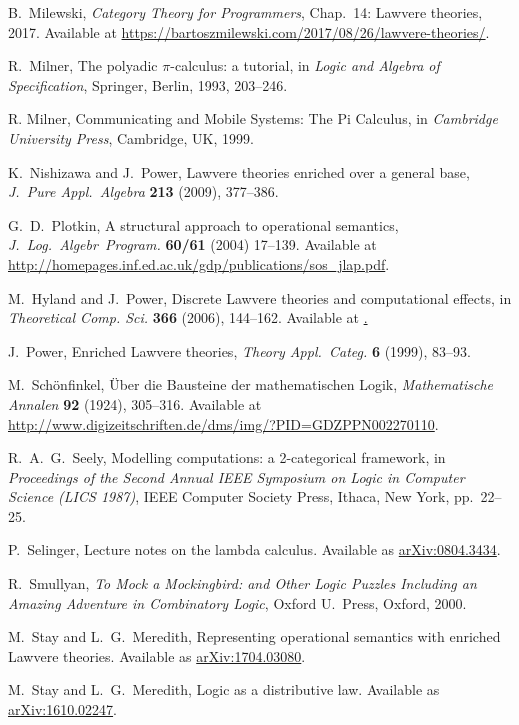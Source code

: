 \documentclass{amsart}
\theoremstyle{definition}
\begin{document}
\begin{thebibliography}{100}

 B.\ Milewski, \textsl{Category Theory for Programmers}, Chap.\ 14: Lawvere theories, 2017.   Available at \href{https://bartoszmilewskiski.com/2017/08/26/lawvere-theories/}{https://bartoszmilewski.com/2017/08/26/lawvere-theories/}.

 R.\ Milner, The polyadic {$\pi$}-calculus: a tutorial, in \textsl{Logic and Algebra of Specification}, Springer, Berlin, 1993, 203--246.

 R. Milner, Communicating and Mobile Systems: The Pi Calculus, in \textsl{Cambridge University Press}, Cambridge, UK, 1999.

 K.\ Nishizawa and J.\ Power, Lawvere theories enriched over a general base, \textsl{J.\ Pure Appl.\ Algebra}  \textbf{213} (2009), 377--386.

 G.\ D.\ Plotkin, A structural approach to operational semantics, \textsl{J.\ Log.\ Algebr\ Program.} \textbf{60/61} (2004) 17--139.  Available at \href{http://homepages.inf.ed.ac.uk/gdp/publications/sos_jlap.pdf}{http://homepages.inf.ed.ac.uk/gdp/publications/sos\_jlap.pdf}.

 M.\ Hyland and J.\ Power, Discrete Lawvere theories and computational effects, in \textsl{Theoretical Comp.
Sci.} \textbf{366} (2006), 144--162. Available at \href{https://core.ac.uk/download/pdf/81105779.pdf}.
  
 J.\ Power, Enriched Lawvere theories, \textsl{Theory Appl.\ Categ.}  \textbf{6} (1999), 83--93.

 M.\ Sch\"{o}nfinkel, \"Uber die Bausteine der mathematischen Logik, 
 \textsl{Mathematische Annalen} \textbf{92} (1924), 305--316.  Available at \href{http://www.digizeitschriften.de/dms/img/?PID=GDZPPN002270110}{http://www.digizeitschriften.de/dms/img/?PID=GDZPPN002270110}.

 R.\ A.\ G.\ Seely, Modelling computations: a 2-categorical framework, in
\textsl{Proceedings of the Second Annual IEEE Symposium on Logic in Computer Science (LICS 1987)}, IEEE Computer Society Press, Ithaca, New York, pp.\ 22--25.
 
  P.\ Selinger, Lecture notes on the lambda calculus.  Available as 
 \href{https://arxiv.org/abs/0804.3434}{arXiv:0804.3434}.

 R.\ Smullyan, \textsl{To Mock a Mockingbird: and Other Logic Puzzles Including an Amazing Adventure in Combinatory Logic}, Oxford U.\ Press, Oxford, 2000.
	
 M.\ Stay and L.\ G.\ Meredith, Representing operational semantics 
with enriched Lawvere theories.  Available as
\href{https://arxiv.org/abs/1704.03080}{arXiv:1704.03080}.

 M.\ Stay and L.\ G.\ Meredith, Logic as a distributive law.  Available as \href{https://arxiv.org/abs/1610.02247}{arXiv:1610.02247}.

\end{thebibliography}
\end{document}
